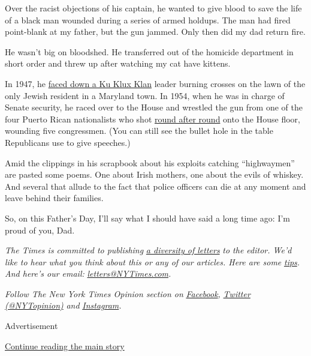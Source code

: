 Over the racist objections of his captain, he wanted to give blood to
save the life of a black man wounded during a series of armed holdups.
The man had fired point-blank at my father, but the gun jammed. Only
then did my dad return fire.

He wasn't big on bloodshed. He transferred out of the homicide
department in short order and threw up after watching my cat have
kittens.

In 1947, he
\href{https://www.nytimes3xbfgragh.onion/2017/08/19/opinion/sunday/trump-neo-nazis-and-the-klan.html}{faced
down a Ku Klux Klan} leader burning crosses on the lawn of the only
Jewish resident in a Maryland town. In 1954, when he was in charge of
Senate security, he raced over to the House and wrestled the gun from
one of the four Puerto Rican nationalists who shot
\href{https://timesmachine.nytimes3xbfgragh.onion/timesmachine/1954/03/02/issue.html}{round
after round} onto the House floor, wounding five congressmen. (You can
still see the bullet hole in the table Republicans use to give
speeches.)

Amid the clippings in his scrapbook about his exploits catching
``highwaymen'' are pasted some poems. One about Irish mothers, one about
the evils of whiskey. And several that allude to the fact that police
officers can die at any moment and leave behind their families.

So, on this Father's Day, I'll say what I should have said a long time
ago: I'm proud of you, Dad.

\emph{The Times is committed to publishing}
\href{https://www.nytimes3xbfgragh.onion/2019/01/31/opinion/letters/letters-to-editor-new-york-times-women.html}{\emph{a
diversity of letters}} \emph{to the editor. We'd like to hear what you
think about this or any of our articles. Here are some}
\href{https://help.nytimes3xbfgragh.onion/hc/en-us/articles/115014925288-How-to-submit-a-letter-to-the-editor}{\emph{tips}}\emph{.
And here's our email:}
\href{mailto:letters@NYTimes.com}{\emph{letters@NYTimes.com}}\emph{.}

\emph{Follow The New York Times Opinion section on}
\href{https://www.facebookcorewwwi.onion/nytopinion}{\emph{Facebook}}\emph{,}
\href{http://twitter.com/NYTOpinion}{\emph{Twitter (@NYTopinion)}}
\emph{and}
\href{https://www.instagram.com/nytopinion/}{\emph{Instagram}}\emph{.}

Advertisement

\protect\hyperlink{after-bottom}{Continue reading the main story}


